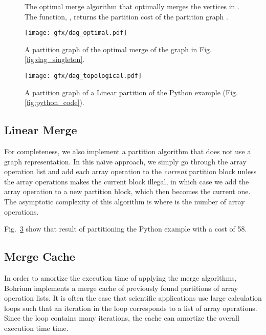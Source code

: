 \ifdefined\LongVersion

\begin{figure}
\footnotesize
\begin{tcolorbox}
    \AlgoOptimalA
\end{tcolorbox}
\begin{tcolorbox}
    \AlgoOptimalB
\end{tcolorbox}
\caption{The optimal merge algorithm that optimally merges the
  vertices in . The function, , returns the partition cost
  of the partition graph .}
\label{algo:optimal}
\end{figure}

\begin{figure}
 \centering
 \texttt{[image: gfx/dag\_optimal.pdf]}
 \caption{A partition graph of the optimal merge of the graph in
   Fig. \ref{fig:dag_singleton}.}
\label{fig:dag_optimal}
\end{figure}

\begin{figure}
 \centering
 \texttt{[image: gfx/dag\_topological.pdf]}
 \caption{A partition graph of a Linear partition of the Python
   example (Fig. \ref{fig:python_code}).}
\label{fig:dag_topological}
\end{figure}

\fi


\subsection{Linear Merge}
For completeness, we also implement a partition algorithm that does
not use a graph representation. In this na\"{\i}ve approach, we simply
go through the array operation list and add each array operation to
the \emph{current} partition block unless the array operations makes
the current block illegal, in which case we add the array operation to
a new partition block, which then becomes the current one. The
asymptotic complexity of this algorithm is  where  is the
number of array operations.

Fig.~\ref{fig:dag_topological} show that result of partitioning the
Python example with a cost of 58.


\subsection{Merge Cache}
In order to amortize the execution time of applying the merge algorithms,
Bohrium implements a merge cache of previously found partitions of
array operation lists. It is often the case that scientific
applications use large calculation loops such that an iteration in the
loop corresponds to a list of array operations. Since the loop
contains many iterations, the cache can amortize the overall execution time
time.

